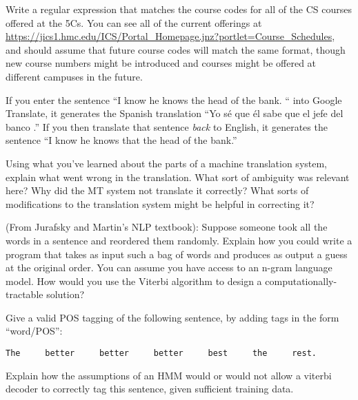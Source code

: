 \documentclass[11pt,letterpaper,boxed]{hmcpset}
\begin{document}
\begin{problem}
Write a regular expression that matches the course codes for all of
the CS courses offered at the 5Cs. You can see all of the current
offerings at
\url{https://jics1.hmc.edu/ICS/Portal_Homepage.jnz?portlet=Course_Schedules},
and should assume that future course codes will match the same format,
though new course numbers might be introduced and courses might be
offered at different campuses in the future.
\end{problem}
\begin{solution}
\vspace{2cm}
\end{solution}

\begin{problem}
If you enter the sentence ``I know he knows the head of the bank. ``
into Google Translate, it generates the Spanish translation ``Yo sé
que él sabe que el jefe del banco .'' If you then translate that
sentence \textit{back} to English, it generates the sentence ``I know
he knows that the head of the bank.'' 

Using what you've learned about the parts of a machine translation
system, explain what went wrong in the translation. What sort of
ambiguity was relevant here? Why did the MT system not translate it
correctly? What sorts of modifications to the translation system might
be helpful in correcting it?
\end{problem}
\begin{solution}
\vspace{6cm}
\end{solution}

\begin{problem}
(From Jurafsky and Martin's NLP textbook): Suppose someone took all
the words in a sentence and reordered them randomly. Explain how you
could write a program that takes as input such a bag of words and
produces as output a guess at the original order. You can assume you
have access to an n-gram language model. How would you use the Viterbi
algorithm to design a computationally-tractable solution?
\end{problem}

\begin{solution}
\vspace{4cm}
\end{solution}

\pagebreak
\begin{problem}
Give a valid POS tagging of the following sentence, by adding tags in
the form ``word/POS'':

\begin{verbatim}
The     better     better     better     best     the     rest.
\end{verbatim}

Explain how the assumptions of an HMM would or would not allow a
viterbi decoder to correctly tag this sentence, given sufficient
training data.
\end{problem}
\end{document}

